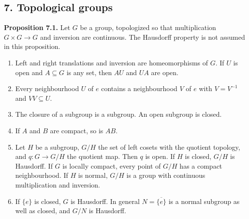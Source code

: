 \documentclass[
  english,
  11pt,
  a4paper,
]{article}
\providecommand{\tightlist}{%
  \setlength{\itemsep}{0pt}\setlength{\parskip}{0pt}}
\begin{document}
\subsection[7. Topological
groups]{\texorpdfstring{\protect\hypertarget{haar-measure-on-locally-compact-groups--oa-fnd-hm-04}{}{}7.
Topological
groups}{7. Topological groups}}\label{haar-measure-on-locally-compact-groups--OA-FND-HM-04}

\textbf{Proposition 7.1.} Let \(G\) be a group, topologized so that
multiplication \(G\times G\to G\) and inversion are continuous. The
Hausdorff property is not assumed in this proposition.

\begin{enumerate}
\tightlist
\item
  Left and right translations and inversion are homeomorphisms of \(G\).
  If \(U\) is open and \(A\subseteq G\) is any set, then \(AU\) and
  \(UA\) are open.
\item
  Every neighbourhood \(U\) of \(e\) contains a neighbourhood \(V\) of
  \(e\) with \(V=V^{-1}\) and \(VV\subseteq U\).
\item
  The closure of a subgroup is a subgroup. An open subgroup is closed.
\item
  If \(A\) and \(B\) are compact, so is \(AB\).
\item
  Let \(H\) be a subgroup, \(G/H\) the set of left cosets with the
  quotient topology, and \(q\colon G\to G/H\) the quotient map. Then
  \(q\) is open. If \(H\) is closed, \(G/H\) is Hausdorff. If \(G\) is
  locally compact, every point of \(G/H\) has a compact neighbourhood.
  If \(H\) is normal, \(G/H\) is a group with continuous multiplication
  and inversion.
\item
  If \(\{e\}\) is closed, \(G\) is Hausdorff. In general
  \(N=\overline{\{e\}}\) is a normal subgroup as well as closed, and
  \(G/N\) is Hausdorff.
\end{enumerate}
\end{document}
